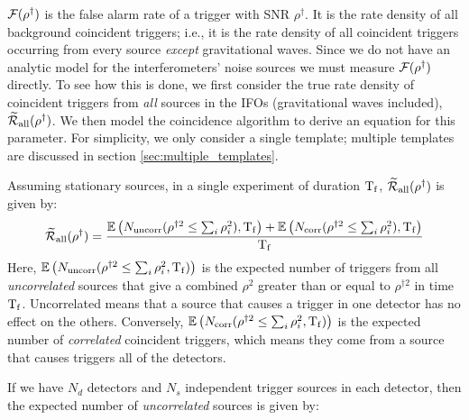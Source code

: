 $\mathcal{F}(\rho^\dagger)$ is the false alarm rate of a trigger with \ac{SNR} $\rho^\dagger$. It is the rate density of all background coincident triggers; i.e., it is the rate density of all coincident triggers occurring from every source \emph{except} gravitational waves. Since we do not have an analytic model for the interferometers' noise sources we must measure $\mathcal{F}(\rho^\dagger)$ directly. To see how this is done, we first consider the true rate density of coincident triggers from \emph{all} sources in the \acp{IFO} (gravitational waves included), $\widetilde{\mathcal{R}}_\mathrm{all}(\rho^\dagger)$. We then model the coincidence algorithm to derive an equation for this parameter. For simplicity, we only consider a single template; multiple templates are discussed in section \ref{sec:multiple_templates}.

Assuming stationary sources, in a single experiment of duration $\mathrm{T_f}$, $\widetilde{\mathcal{R}}_\mathrm{all}(\rho^\dagger)$ is given by:
\begin{equation}
\label{eqn:rate_param}
\widetilde{\RP}_{\mathrm{all}}(\rho^\dagger) = \frac{\Exptd\left(N_{\mathrm{uncorr}}(\rho^{\dagger2} \leq \sum_i\rho_i^2),\Tf\right) + \Exptd\left(N_{\mathrm{corr}}(\rho^{\dagger2} \leq \sum_i\rho_i^2),\Tf\right)}{\Tf}
\end{equation}
Here, $\mathbb{E}\left(N_{\mathrm{uncorr}}(\rho^{\dagger2} \leq \sum_i\rho_i^2, \mathrm{T_f})\right)$ is the expected number of triggers from all \emph{uncorrelated} sources that give a combined $\rho^2$ greater than or equal to $\rho^{\dagger2}$ in time $\mathrm{T_f}$. Uncorrelated means that a source that causes a trigger in one detector has no effect on the others. Conversely, $\mathbb{E}\left(N_{\mathrm{corr}}(\rho^{\dagger2} \leq \sum_i\rho_i^2, \mathrm{T_f})\right)$ is the expected number of \emph{correlated} coincident triggers, which means they come from a source that causes triggers all of the detectors.

If we have $N_d$ detectors and $N_s$ independent trigger sources in each detector, then the expected number of \emph{uncorrelated} sources is given by:

